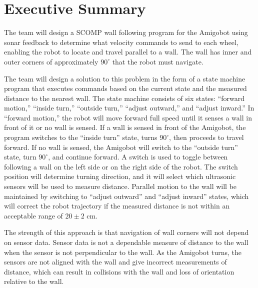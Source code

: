 \section{Executive Summary}
The team will design a SCOMP wall following program for the Amigobot
using sonar feedback to determine what velocity commands to send to
each wheel, enabling the robot to locate and travel parallel to a
wall. The wall has inner and outer corners of approximately \(90^\circ\) that the robot must
navigate. 

 The team will design a solution to this problem in the form
of a state machine program that executes commands based on the current
state and the measured distance to the nearest wall. The state machine
consists of six states: ``forward motion,'' ``inside turn,'' ``outside
turn,'' ``adjust outward,'' and ``adjust inward.'' In ``forward
motion,'' the robot will move forward full speed until it senses a
wall in front of it or no wall is sensed. If a wall is sensed in front
of the Amigobot, the program switches to the ``inside turn'' state,
turns \(90^\circ\), then proceeds to travel forward. If no wall is sensed, the
Amigobot will switch to the ``outside turn'' state, turn \(90^\circ\), and
continue forward. A switch is used to toggle between following a wall
on the left side or on the right side of the robot. The switch position will determine
turning direction, and it will select which ultrasonic sensors will be
used to measure distance. Parallel motion to the wall will be
maintained by switching to ``adjust outward'' and ``adjust inward''
states, which will correct the robot trajectory if the measured
distance is not within an acceptable range of \(20\pm2\) cm.  

The strength of this approach is that navigation of wall corners will not
depend on sensor data. Sensor data is not a dependable measure of
distance to the wall when the sensor is not perpendicular to the
wall. As the Amigobot turns, the sensors are not aligned with the wall
and give incorrect measurements of distance, which can result in
collisions with the wall and loss of orientation relative to the wall.
